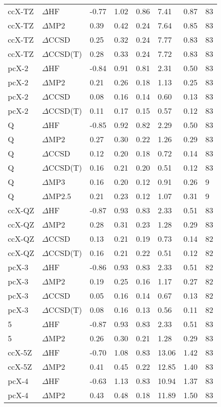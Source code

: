 \begin{table}
\begin{tabular}{l l l l l l l l }
    ccX-TZ & $\Delta$HF & -0.77 & 1.02 & 0.86 & 7.41 & 0.87 & 83 \\ 
    ccX-TZ & $\Delta$MP2 & 0.39 & 0.42 & 0.24 & 7.64 & 0.85 & 83 \\ 
    ccX-TZ & $\Delta$CCSD & 0.25 & 0.32 & 0.24 & 7.77 & 0.83 & 83 \\ 
    ccX-TZ & $\Delta$CCSD(T) & 0.28 & 0.33 & 0.24 & 7.72 & 0.83 & 83 \\ 
    pcX-2 & $\Delta$HF & -0.84 & 0.91 & 0.81 & 2.31 & 0.50 & 83 \\ 
    pcX-2 & $\Delta$MP2 & 0.21 & 0.26 & 0.18 & 1.13 & 0.25 & 83 \\ 
    pcX-2 & $\Delta$CCSD & 0.08 & 0.16 & 0.14 & 0.60 & 0.13 & 83 \\ 
    pcX-2 & $\Delta$CCSD(T) & 0.11 & 0.17 & 0.15 & 0.57 & 0.12 & 83 \\ 
    Q & $\Delta$HF & -0.85 & 0.92 & 0.82 & 2.29 & 0.50 & 83 \\ 
    Q & $\Delta$MP2 & 0.27 & 0.30 & 0.22 & 1.26 & 0.29 & 83 \\ 
    Q & $\Delta$CCSD & 0.12 & 0.20 & 0.18 & 0.72 & 0.14 & 83 \\ 
    Q & $\Delta$CCSD(T) & 0.16 & 0.21 & 0.20 & 0.51 & 0.12 & 83 \\ 
    Q & $\Delta$MP3 & 0.16 & 0.20 & 0.12 & 0.91 & 0.26 & 9 \\ 
    Q & $\Delta$MP2.5 & 0.21 & 0.23 & 0.12 & 1.07 & 0.31 & 9 \\ 
    ccX-QZ & $\Delta$HF & -0.87 & 0.93 & 0.83 & 2.33 & 0.51 & 83 \\ 
    ccX-QZ & $\Delta$MP2 & 0.28 & 0.31 & 0.23 & 1.28 & 0.29 & 83 \\ 
    ccX-QZ & $\Delta$CCSD & 0.13 & 0.21 & 0.19 & 0.73 & 0.14 & 82 \\ 
    ccX-QZ & $\Delta$CCSD(T) & 0.16 & 0.21 & 0.22 & 0.51 & 0.12 & 82 \\ 
    pcX-3 & $\Delta$HF & -0.86 & 0.93 & 0.83 & 2.33 & 0.51 & 82 \\ 
    pcX-3 & $\Delta$MP2 & 0.19 & 0.25 & 0.16 & 1.17 & 0.27 & 82 \\ 
    pcX-3 & $\Delta$CCSD & 0.05 & 0.16 & 0.14 & 0.67 & 0.13 & 82 \\ 
    pcX-3 & $\Delta$CCSD(T) & 0.08 & 0.16 & 0.13 & 0.56 & 0.11 & 82 \\ 
    5 & $\Delta$HF & -0.87 & 0.93 & 0.83 & 2.33 & 0.51 & 83 \\ 
    5 & $\Delta$MP2 & 0.26 & 0.30 & 0.21 & 1.28 & 0.29 & 83 \\ 
    ccX-5Z & $\Delta$HF & -0.70 & 1.08 & 0.83 & 13.06 & 1.42 & 83 \\ 
    ccX-5Z & $\Delta$MP2 & 0.41 & 0.45 & 0.22 & 12.85 & 1.40 & 83 \\ 
    pcX-4 & $\Delta$HF & -0.63 & 1.13 & 0.83 & 10.94 & 1.37 & 83 \\ 
    pcX-4 & $\Delta$MP2 & 0.43 & 0.48 & 0.18 & 11.89 & 1.50 & 83 \\ 
    \bottomrule
  \end{tabular}
\end{table}
